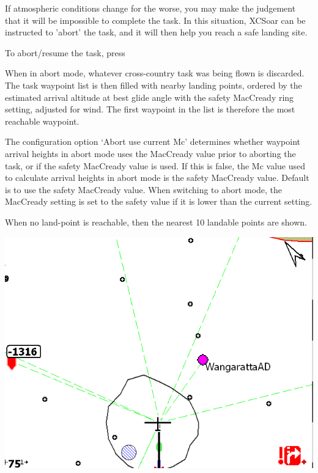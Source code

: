 \documentclass[a4paper,12pt]{refrep}
\begin{document}
If atmospheric conditions change for the worse, you may make the
judgement that it will be impossible to complete the task.  In this
situation, XCSoar can be instructed to 'abort' the task, and it will
then help you reach a safe landing site.

To abort/resume the task, press
\begin{quote}
\blink{}
\end{quote}

When in abort mode, whatever cross-country task was being flown is
discarded.  The task waypoint list is then filled with nearby landing
points, ordered by the estimated arrival altitude at best glide angle
with the safety MacCready ring setting, adjusted for wind.  The
first waypoint in the list is therefore the most reachable waypoint.

The configuration option `Abort use current Mc' determines whether
waypoint arrival heights in abort mode uses the MacCready value prior
to aborting the task, or if the safety MacCready value is used.  If
this is false, the Mc value used to calculate arrival heights in abort
mode is the safety MacCready value.  Default is to use the safety
MacCready value.  When switching to abort mode, the MacCready setting
is set to the safety value if it is lower than the current setting.

When no land-point is reachable, then the nearest 10 landable points
are shown. 

\begin{center}
\includegraphics[angle=0,width=\linewidth,keepaspectratio='true']{figures/abort-low.png}
\end{center}
\end{document}
